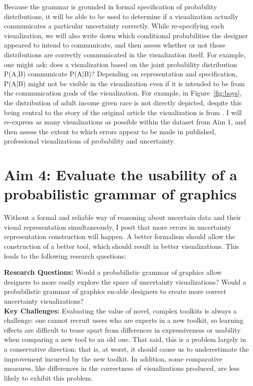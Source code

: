 \documentclass[11pt]{article}
\begin{document}
\vspace{-1.0em}
\noindent\hrulefill

\noindent Because the grammar is grounded in formal specification of probability distributions, it will be able to be used to determine if a visualization actually communicates a particular uncertainty correctly. While re-specifying each visualization, we will also write down which conditional probabilities the designer appeared to intend to communicate, and then assess whether or not those distributions are correctly communicated in the visualization itself. For example, one might ask: does a visualization based on the joint probability distribution P(A,B) communicate P(A|B)? Depending on representation and specification, P(A|B) might not be visible in the visualization even if it is intended to be from the communication goals of the visualization. For example, in Figure~\ref{fig:boys}, the distribution of adult income given race is not directly depicted, despite this being central to the story of the original article the visualization is from \cite{badger2018extensive}. I will re-express as many visualizations as possible within the dataset from Aim 1, and then assess the extent to which errors appear to be made in published, professional visualizations of probability and uncertainty. 



\section{Aim 4: Evaluate the usability of a probabilistic grammar of graphics}

\noindent Without a formal and reliable way of reasoning about uncertain data and their visual representation simultaneously, I posit that more errors in uncertainty representation construction will happen. A better formalism should allow the construction of a better tool, which should result in better visualizations. This leads to the following research questions:


\noindent\hrulefill
\vspace{-0.5em}

\noindent\textbf{Research Questions:}
Would a probabilistic grammar of graphics allow designers to more easily explore the space of uncertainty visualizations? Would a probabilistic grammar of graphics en-able designers to create more correct uncertainty visualizations?
\\
\noindent\textbf{Key Challenges:}
Evaluating the value of novel, complex toolkits is always a challenge: one cannot recruit users who are experts in a new toolkit, so learning effects are difficult to tease apart from differences in expressiveness or usability when comparing a new tool to an old one. That said, this is a problem largely in a conservative direction: that is, at worst, it should cause us to underestimate the improvement incurred by the new toolkit. In addition, some comparative measures, like differences in the correctness of visualizations produced, are less likely to exhibit this problem.
\end{document}

